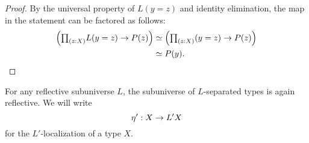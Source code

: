 \begin{proof}
By the universal property of $L(y=z)$ and identity elimination,
the map in the statement can be factored as follows:
\begin{align*}
\Big(\prd{z:X}L(y=z)\to P(z)\Big) & \simeq \Big(\prd{z:X}(y=z)\to P(z)\Big) \\
& \simeq P(y).\qedhere
\end{align*}
\end{proof}

\begin{thm}\label{thm:Lsep}
For any reflective subuniverse $L$, the subuniverse of $L$-separated types is again reflective. We will write
\begin{equation*}
{\eta_{}}':X\to L'X
\end{equation*}
for the $L'$-localization of a type $X$.
\end{thm}

